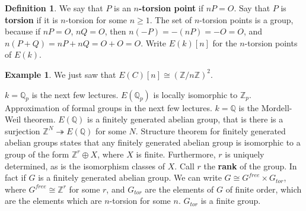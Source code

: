 \documentclass{article}
\newcommand{\Z}{\mathbb{Z}}
\newcommand{\Q}{\mathbb{Q}}
\newcommand{\rb}[1]{\left( #1 \right)}
\renewcommand{\sb}[1]{\left[ #1 \right]}
\theoremstyle{definition}\newtheorem{definition}{Definition}[section]
\theoremstyle{definition}\newtheorem{remark}[definition]{Remark}
\theoremstyle{definition}\newtheorem*{example}{Example}
\theoremstyle{definition}\newtheorem*{note}{Note}
\begin{document}
\begin{definition}
We say that $ P $ is an \textbf{$ n $-torsion point} if $ nP = O $. Say that $ P $ is \textbf{torsion} if it is $ n $-torsion for some $ n \ge 1 $. The set of $ n $-torsion points is a group, because if $ nP = O $, $ nQ = O $, then $ n\rb{-P} = -\rb{nP} = -O = O $, and $ n\rb{P + Q} = nP + nQ = O + O = O $. Write $ E\rb{k}\sb{n} $ for the $ n $-torsion points of $ E\rb{k} $.
\end{definition}

\begin{example}
We just saw that $ E\rb{C}\sb{n} \cong \rb{\Z / n\Z}^2 $.
\end{example}

$ k = \Q_p $ is the next few lectures. $ E\rb{\Q_p} $ is locally isomorphic to $ \Z_p $. Approximation of formal groups in the next few lectures. $ k = \Q $ is the Mordell-Weil theorem. $ E\rb{\Q} $ is a finitely generated abelian group, that is there is a surjection $ \Z^N \twoheadrightarrow E\rb{\Q} $ for some $ N $. Structure theorem for finitely generated abelian groups states that any finitely generated abelian group is isomorphic to a group of the form $ \Z^r \oplus X $, where $ X $ is finite. Furthermore, $ r $ is uniquely determined, as is the isomorphism classes of $ X $. Call $ r $ the \textbf{rank} of the group. In fact if $ G $ is a finitely generated abelian group. We can write $ G \cong G^{free} \times G_{tor} $, where $ G^{free} \cong \Z^r $ for some $ r $, and $ G_{tor} $ are the elements of $ G $ of finite order, which are the elements which are $ n $-torsion for some $ n $. $ G_{tor} $ is a finite group.
\end{document}
